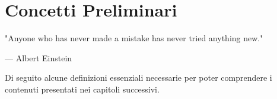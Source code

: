 \documentclass[12pt,oneside,openany]{memoir}
\numberwithin{equation}{subsection}
\begin{document}

\chapter{Concetti Preliminari}
\epigraph{
	"Anyone who has never made a mistake has never tried anything new."
}{--- \textup{Albert Einstein}}

Di seguito alcune definizioni essenziali necessarie per poter comprendere i
contenuti presentati nei capitoli successivi.

\end{document}
